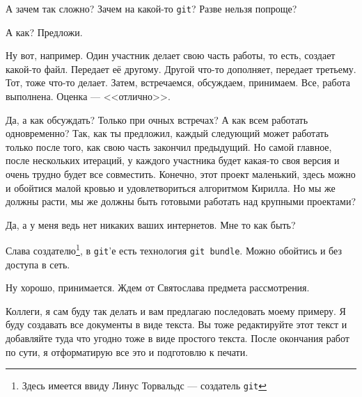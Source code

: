 \documentclass[14pt,a4paper]{article}
\begin{document}
 А зачем так сложно? Зачем на какой-то \texttt{git}? Разве нельзя попроще?

 А как? Предложи.

 Ну вот, например. Один участник делает свою часть работы, то есть, создает какой-то файл.
Передает её другому. Другой что-то дополняет, передает третьему. Тот, тоже что-то делает. Затем,
встречаемся, обсуждаем, принимаем. Все, работа выполнена. Оценка --- <<отлично>>.

 Да, а как обсуждать? Только при очных встречах? А как всем работать одновременно? Так, 
как ты предложил, каждый следующий может работать только после того, как свою часть закончил предыдущий.
Но самой главное, после нескольких итераций, у каждого участника будет какая-то своя версия и очень трудно
будет все совместить. Конечно, этот проект маленький, здесь можно и обойтися малой кровью и удовлетвориться
алгоритмом Кирилла. Но мы же должны расти, мы же должны быть готовыми работать над  крупными проектами?

 Да, а у меня ведь нет никаких ваших интернетов. Мне то как быть?

 Слава создателю\footnote{Здесь имеется ввиду Линус Торвальдс --- создатель \texttt{git}}, в \texttt{git}'е есть технология \texttt{git bundle}. Можно обойтись 
и без доступа в сеть. 

 Ну хорошо, принимается. Ждем от Святослава предмета рассмотрения. 

 Коллеги, я сам буду так делать и вам предлагаю последовать моему примеру. Я буду
создавать все документы в виде текста. Вы тоже редактируйте этот текст и добавляйте туда что угодно
тоже в виде простого текста. После окончания работ по сути, я отформатирую все это и подготовлю к 
печати. 
\end{document}

